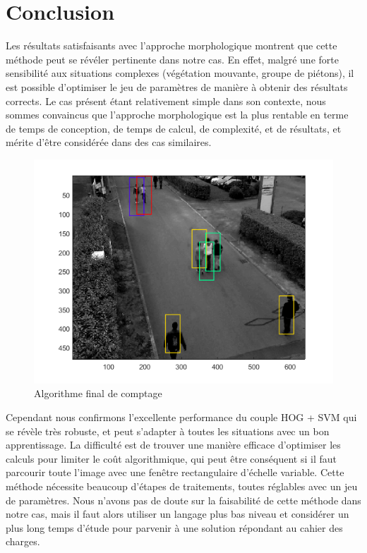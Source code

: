 \documentclass{article}
\begin{document}
	
\section{Conclusion}
	
	Les résultats satisfaisants avec l'approche morphologique montrent que cette méthode peut se révéler pertinente dans notre cas. En effet, malgré une forte sensibilité aux situations complexes (végétation mouvante, groupe de piétons), il est possible d'optimiser le jeu de paramètres de manière à obtenir des résultats corrects. Le cas présent étant relativement simple dans son contexte, nous sommes convaincus que l'approche morphologique est la plus rentable en terme de temps de conception, de temps de calcul, de complexité, et de résultats, et mérite d'être considérée dans des cas similaires.
	\begin{figure}[hh]
		\begin{center}			
			\includegraphics[scale=0.4]{Img/Identfications_Redondants}
		\end{center}
		\caption{Algorithme final de comptage}
	\end{figure}

	Cependant nous confirmons l'excellente performance du couple HOG + SVM qui se révèle très robuste, et peut s'adapter à toutes les situations avec un bon apprentissage. La difficulté est de trouver une manière efficace d'optimiser les calculs pour limiter le coût algorithmique, qui peut être conséquent si il faut parcourir toute l'image avec une fenêtre rectangulaire d'échelle variable. Cette méthode nécessite beaucoup d'étapes de traitements, toutes réglables avec un jeu de paramètres. Nous n'avons pas de doute sur la faisabilité de cette méthode dans notre cas, mais il faut alors utiliser un langage plus bas niveau et considérer un plus long temps d'étude pour parvenir à une solution répondant au cahier des charges.



\end{document}
